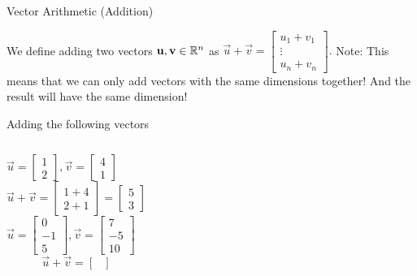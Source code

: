 \documentclass[xcoler=dvipsnames, aspectratio=169]{beamer}
\begin{document}
    \begin{frame}{Vector Arithmetic (Addition)}
        \small
        \begin{defn}
            We define adding two vectors $\mathbf{u},\mathbf{v}\in\mathbb{R}^n$ as
            $
                \vec{u} + \vec{v} = \begin{bmatrix}
                    u_1 + v_1 \\
                    \vdots \\
                    u_n + v_n
                \end{bmatrix}.
            $ Note: This means that we can only add vectors with the same dimensions together! And the result will have the same dimension!
        \end{defn}
        \pause
        \begin{example}
            Adding the following vectors
            \begin{columns}
                \scriptsize
                    $\vec{u} = \begin{bmatrix}1\\2\end{bmatrix}, \vec{v} = \begin{bmatrix}4\\1\end{bmatrix}$
                        \[
                            \vec{u}+\vec{v} = \begin{bmatrix}
                                1+4 \\
                                2+1
                            \end{bmatrix} = \begin{bmatrix}
                                5\\3
                            \end{bmatrix}
                        \]
                    $\vec{u} = \begin{bmatrix}0\\-1\\5\end{bmatrix}, \vec{v} = \begin{bmatrix}7\\-5\\10\end{bmatrix}$
                        \[
                            \vec{u}+\vec{v} = \begin{bmatrix}

\end{bmatrix}\]
\end{columns}
\end{example}
\end{frame}
\end{document}
